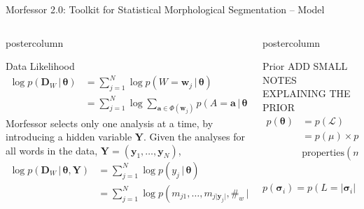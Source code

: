 \documentclass[final]{beamer} %
\newcommand{\mat}[1]{\mathbf{#1}}
\newcommand{\seq}[1]{\boldsymbol{#1}}
\newcommand{\txt}[1]{\textrm{#1}}
\newcommand{\len}[1]{\lvert#1\rvert}
\newcommand{\params}{\boldsymbol{\theta}}
\newcommand{\data}{\seq{D}}
\newcommand{\lexicon}{\mathcal{L}}
\newcommand{\tokenset}{\Phi}
\newcommand{\bound}{\#}
\newcommand{\vb}{\,|\,}
\newcommand{\Y}{\mat{Y}}
\begin{document}
\begin{frame}{Morfessor 2.0: Toolkit for Statistical Morphological Segmentation -- Model}
\begin{columns}
\begin{column}{.4\textwidth}
      \begin{beamercolorbox}[center,wd=\textwidth]{postercolumn}
 \begin{block}{Data Likelihood}
\begin{align*}
  \log p(\data_W \vb \params)
  & = \sum_{j=1}^{N} \log p(W=\seq{w}_j \vb \params) \nonumber \\
  & = \sum_{j=1}^{N} \log \sum_{\seq{a} \in \tokenset(\seq{w}_j)}
  p(A=\seq{a} \vb \params),
\end{align*}
 Morfessor selects only one analysis at a time, by introducing a hidden variable $\Y$. Given the analyses for
all words in the data, $\Y = (\seq{y}_1, \ldots, \seq{y}_N)$,
\begin{align*}
  \log p(\data_W \vb \params, \Y)
  & = \sum_{j=1}^{N} \log 
  p(y_j \vb \params) 
  \\&= \sum_{j=1}^{N} \log 
  p(m_{j1}, \ldots, m_{j\len{\seq{y}_j}}, \bound_w \vb \params) 
\label{eq:morphylikelihood}
\end{align*}

            \end{block}
	\end{beamercolorbox}





\end{column}

\begin{column}{.3\textwidth}

      \begin{beamercolorbox}[center,wd=\textwidth]{postercolumn}
 \begin{block}{Prior}
ADD SMALL NOTES EXPLAINING THE PRIOR
\begin{align*}
p(\params) & = p(\lexicon)\\ &= p(\mu) \times p(\txt{properties}(m_1), \ldots, \\&\txt{properties}(m_{\mu})) \times \mu!.
\end{align*}

\begin{equation*}
  p(\seq{\sigma}_i) = p(L=\len{\seq{\sigma}_i})
  \prod_{j=1}^{\len{\seq{\sigma}_i}} p(C=\seq{\sigma}_{ij})
\end{equation*}

            \end{block}
	\end{beamercolorbox}

\vfill




\end{column}
\end{columns}
\end{frame}
\end{document}
